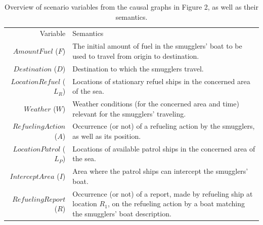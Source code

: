 \documentclass[conference]{IEEEtran}
\begin{document}
\begin{table}[!ht]
 \centering
 \caption{Overview of scenario variables from the causal graphs in Figure 2, as well as their semantics.}
 \begin{tabular}[!ht]{rp{5cm}}
\toprule
 Variable & Semantics \\
\cmidrule(r){1-1}
\cmidrule(l){2-2}
$AmountFuel$ ($F$) &
The initial amount of fuel in the smugglers' boat to be used to travel from origin to destination. \\
$Destination$ ($D$) &
Destination to which the smugglers travel. \\
$LocationRefuel$ ($L_R$) &
Locations of stationary refuel ships in the concerned area of the sea. \\
$Weather$ ($W$) &
Weather conditions (for the concerned area and time) relevant for the smugglers' traveling. \\
$RefuelingAction$ ($A$) &
Occurrence (or not) of a refueling action by the smugglers, as well as its position. \\
$LocationPatrol$ ($L_P$) &
Locations of available patrol ships in the concerned area of the sea. \\
$InterceptArea$ ($I$) &
Area where the patrol ships can intercept the smugglers' boat. \\
$RefuelingReport$ ($R$) &
Occurrence (or not) of a report, made by refueling ship at location $R_1$, on the refueling action by a boat matching the smugglers' boat description. \\
\bottomrule
\end{tabular}
\label{tab:scenario-variables}
\end{table}


\end{document}
